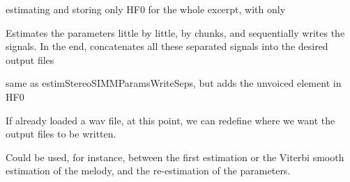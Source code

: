 \documentclass[letterpaper,10pt,english]{sphinxmanual}
\begin{document}
\begin{fulllineitems}
\begin{fulllineitems}
\label{reference/separateleadstereo:pyfasst.SeparateLeadStereo.SeparateLeadStereoTF.SeparateLeadProcess.estimHF0}
estimating and storing only HF0 for the whole excerpt,
with only

\end{fulllineitems}


\begin{fulllineitems}
\label{reference/separateleadstereo:pyfasst.SeparateLeadStereo.SeparateLeadStereoTF.SeparateLeadProcess.estimStereoSIMMParamsWriteSeps}
Estimates the parameters little by little, by chunks,
and sequentially writes the signals. In the end, concatenates all these
separated signals into the desired output files

\end{fulllineitems}


\begin{fulllineitems}
\label{reference/separateleadstereo:pyfasst.SeparateLeadStereo.SeparateLeadStereoTF.SeparateLeadProcess.estimStereoSUIMMParamsWriteSeps}
same as estimStereoSIMMParamsWriteSeps, but adds the unvoiced
element in HF0

\end{fulllineitems}


\begin{fulllineitems}
\label{reference/separateleadstereo:pyfasst.SeparateLeadStereo.SeparateLeadStereoTF.SeparateLeadProcess.setOutputFileNames}
If already loaded a wav file, at this point, we can redefine
where we want the output files to be written.

Could be used, for instance, between the first estimation or the
Viterbi smooth estimation of the melody, and the re-estimation
of the parameters.


\end{fulllineitems}
\end{fulllineitems}
\end{document}
